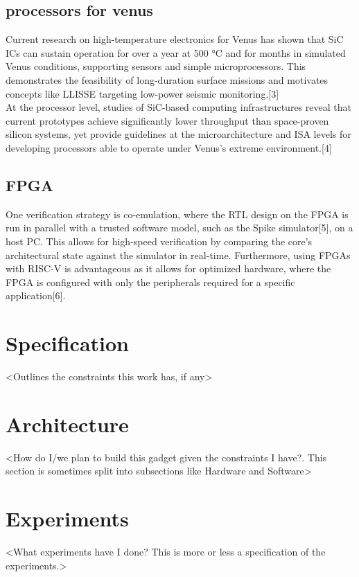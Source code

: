 \documentclass[10pt,twocolumn]{article}
\begin{document}
\subsection{processors for venus}
Current research on high-temperature electronics for Venus has shown that SiC ICs can sustain operation for over a year at 500 °C and for months in simulated Venus conditions, supporting sensors and simple microprocessors. This demonstrates the feasibility of long-duration surface missions and motivates concepts like LLISSE targeting low-power seismic monitoring.[3] \\
At the processor level, studies of SiC-based computing infrastructures reveal that current prototypes achieve significantly lower throughput than space-proven silicon systems, yet provide guidelines at the microarchitecture and ISA levels for developing processors able to operate under Venus’s extreme environment.[4]\\
\subsection{FPGA}
One verification strategy is co-emulation, where the RTL design on the FPGA is run in parallel with a trusted software model, such as the Spike simulator[5], on a host PC. This allows for high-speed verification by comparing the core's architectural state against the simulator in real-time. Furthermore, using FPGAs with RISC-V is advantageous as it allows for optimized hardware, where the FPGA is configured with only the peripherals required for a specific application[6].

\section{Specification}
<Outlines the constraints this work has, if any>\\

\section{Architecture}
<How do I/we plan to build this gadget given the constraints I have?. This section is sometimes split into subsections like Hardware and Software>

\section{Experiments}
<What experiments have I done? This is more or less a specification of the experiments.>
\end{document}

